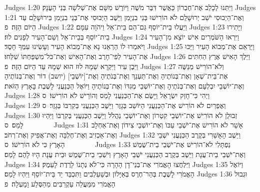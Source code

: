 Judges 1:20	וַיִּתְּנוּ לְכָלֵב אֶת־חֶבְרוֹן כַּאֲשֶׁר דִּבֶּר מֹשֶׁה וַיּוֹרֶשׁ מִשָּׁם אֶת־שְׁלֹשָׁה בְּנֵי הָעֲנָק׃
Judges 1:21	וְאֶת־הַיְבוּסִי יֹשֵׁב יְרוּשָׁלַ͏ִם לֹא הוֹרִישׁוּ בְּנֵי בִנְיָמִן וַיֵּשֶׁב הַיְבוּסִי אֶת־בְּנֵי בִנְיָמִן בִּירוּשָׁלַ͏ִם עַד הַיּוֹם הַזֶּה׃ {פ}
Judges 1:22	וַיַּעֲלוּ בֵית־יוֹסֵף גַּם־הֵם בֵּית־אֵל וַיהֹוָה עִמָּם׃
Judges 1:23	וַיָּתִירוּ בֵית־יוֹסֵף בְּבֵית־אֵל וְשֵׁם־הָעִיר לְפָנִים לוּז׃
Judges 1:24	וַיִּרְאוּ הַשֹּׁמְרִים אִישׁ יוֹצֵא מִן־הָעִיר וַיֹּאמְרוּ לוֹ הַרְאֵנוּ נָא אֶת־מְבוֹא הָעִיר וְעָשִׂינוּ עִמְּךָ חָסֶד׃
Judges 1:25	וַיַּרְאֵם אֶת־מְבוֹא הָעִיר וַיַּכּוּ אֶת־הָעִיר לְפִי־חָרֶב וְאֶת־הָאִישׁ וְאֶת־כּל־מִשְׁפַּחְתּוֹ שִׁלֵּחוּ׃
Judges 1:26	וַיֵּלֶךְ הָאִישׁ אֶרֶץ הַחִתִּים וַיִּבֶן עִיר וַיִּקְרָא שְׁמָהּ לוּז הוּא שְׁמָהּ עַד הַיּוֹם הַזֶּה׃ {פ}
Judges 1:27	וְלֹא־הוֹרִישׁ מְנַשֶּׁה אֶת־בֵּית־שְׁאָן וְאֶת־בְּנוֹתֶיהָ וְאֶת־תַּעְנַךְ וְאֶת־בְּנֹתֶיהָ וְאֶת־[יוֹשְׁבֵי] (יושב) דוֹר וְאֶת־בְּנוֹתֶיהָ וְאֶת־יוֹשְׁבֵי יִבְלְעָם וְאֶת־בְּנֹתֶיהָ וְאֶת־יוֹשְׁבֵי מְגִדּוֹ וְאֶת־בְּנוֹתֶיהָ וַיּוֹאֶל הַכְּנַעֲנִי לָשֶׁבֶת בָּאָרֶץ הַזֹּאת׃
Judges 1:28	וַיְהִי כִּי־חָזַק יִשְׂרָאֵל וַיָּשֶׂם אֶת־הַכְּנַעֲנִי לָמַס וְהוֹרֵישׁ לֹא הוֹרִישׁוֹ׃ {ס}        
Judges 1:29	וְאֶפְרַיִם לֹא הוֹרִישׁ אֶת־הַכְּנַעֲנִי הַיּוֹשֵׁב בְּגָזֶר וַיֵּשֶׁב הַכְּנַעֲנִי בְּקִרְבּוֹ בְּגָזֶר׃ {ס}        
Judges 1:30	זְבוּלֻן לֹא הוֹרִישׁ אֶת־יוֹשְׁבֵי קִטְרוֹן וְאֶת־יוֹשְׁבֵי נַהֲלֹל וַיֵּשֶׁב הַכְּנַעֲנִי בְּקִרְבּוֹ וַיִּהְיוּ לָמַס׃ {ס}        
Judges 1:31	אָשֵׁר לֹא הוֹרִישׁ אֶת־יֹשְׁבֵי עַכּוֹ וְאֶת־יוֹשְׁבֵי צִידוֹן וְאֶת־אַחְלָב וְאֶת־אַכְזִיב וְאֶת־חֶלְבָּה וְאֶת־אֲפִיק וְאֶת־רְחֹב׃
Judges 1:32	וַיֵּשֶׁב הָאָשֵׁרִי בְּקֶרֶב הַכְּנַעֲנִי יֹשְׁבֵי הָאָרֶץ כִּי לֹא הוֹרִישׁוֹ׃ {ס}        
Judges 1:33	נַפְתָּלִי לֹא־הוֹרִישׁ אֶת־יֹשְׁבֵי בֵית־שֶׁמֶשׁ וְאֶת־יֹשְׁבֵי בֵית־עֲנָת וַיֵּשֶׁב בְּקֶרֶב הַכְּנַעֲנִי יֹשְׁבֵי הָאָרֶץ וְיֹשְׁבֵי בֵית־שֶׁמֶשׁ וּבֵית עֲנָת הָיוּ לָהֶם לָמַס׃
Judges 1:34	וַיִּלְחֲצוּ הָאֱמֹרִי אֶת־בְּנֵי־דָן הָהָרָה כִּי־לֹא נְתָנוֹ לָרֶדֶת לָעֵמֶק׃
Judges 1:35	וַיּוֹאֶל הָאֱמֹרִי לָשֶׁבֶת בְּהַר־חֶרֶס בְּאַיָּלוֹן וּבְשַׁעַלְבִים וַתִּכְבַּד יַד בֵּית־יוֹסֵף וַיִּהְיוּ לָמַס׃
Judges 1:36	וּגְבוּל הָאֱמֹרִי מִמַּעֲלֵה עַקְרַבִּים מֵהַסֶּלַע וָמָעְלָה׃ {פ}
